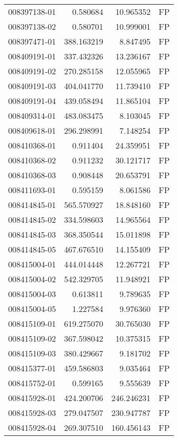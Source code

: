 \begin{tabular}{lrrl}
008397138-01 &    0.580684 &    10.965352 &   FP \\
008397138-02 &    0.580701 &    10.999001 &   FP \\
008397471-01 &  388.163219 &     8.847495 &   FP \\
008409191-01 &  337.432326 &    13.236167 &   FP \\
008409191-02 &  270.285158 &    12.055965 &   FP \\
008409191-03 &  404.041770 &    11.739410 &   FP \\
008409191-04 &  439.058494 &    11.865104 &   FP \\
008409314-01 &  483.083475 &     8.103045 &   FP \\
008409618-01 &  296.298991 &     7.148254 &   FP \\
008410368-01 &    0.911404 &    24.359951 &   FP \\
008410368-02 &    0.911232 &    30.121717 &   FP \\
008410368-03 &    0.908448 &    20.653791 &   FP \\
008411693-01 &    0.595159 &     8.061586 &   FP \\
008414845-01 &  565.570927 &    18.848160 &   FP \\
008414845-02 &  334.598603 &    14.965564 &   FP \\
008414845-03 &  368.350544 &    15.011898 &   FP \\
008414845-05 &  467.676510 &    14.155409 &   FP \\
008415004-01 &  444.014448 &    12.267721 &   FP \\
008415004-02 &  542.329705 &    11.948921 &   FP \\
008415004-03 &    0.613811 &     9.789635 &   FP \\
008415004-05 &    1.227584 &     9.976360 &   FP \\
008415109-01 &  619.275070 &    30.765030 &   FP \\
008415109-02 &  367.598042 &    10.375315 &   FP \\
008415109-03 &  380.429667 &     9.181702 &   FP \\
008415377-01 &  459.586803 &     9.035464 &   FP \\
008415752-01 &    0.599165 &     9.555639 &   FP \\
008415928-01 &  424.200706 &   246.246231 &   FP \\
008415928-03 &  279.047507 &   230.947787 &   FP \\
008415928-04 &  269.307510 &   160.456143 &   FP \\

\end{tabular}
